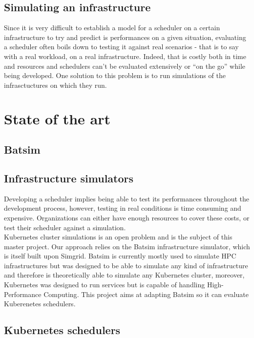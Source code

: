 \documentclass[12pt, a4paper]{memoir}
\begin{document}
\section{Simulating an infrastructure}
Since it is very difficult to establish a model for a scheduler on a certain
infrastructure to try and predict is performances on a given situation,
evaluating a scheduler often boils down to testing it against real scenarios -
that is to say with a real workload, on a real infrastructure. Indeed, that is
costly both in time and resources and schedulers can't be evaluated extensively
or ``on the go'' while being developed. One solution to this problem is to run
simulations of the infrasctuctures on which they run.


\chapter{State of the art}
\section{Batsim}
\section{Infrastructure simulators}

Developing a scheduler implies being able to test its performances throughout
the development process, however, testing in real conditions is time consuming
and expensive.  Organizations can either have enough resources to cover these
costs, or test their scheduler against a simulation.\\

Kubernetes cluster simulations is an open problem and is the subject of this
master project. Our approach relies on the Batsim\cite{batsim} infrastructure
simulator, which is itself built upon Simgrid\cite{simgrid}. Batsim is
currently mostly used to simulate HPC infrastructures but was designed to be
able to simulate any kind of infrastructure and therefore is theoretically able
to simulate any Kubernetes cluster, moreover, Kubernetes was designed to run
services but is capable of handling High-Performance
Computing\cite{kube-for-hpc}. This project aims at adapting Batsim so it can
evaluate Kuberenetes schedulers.

\section{Kubernetes schedulers}
\end{document}
